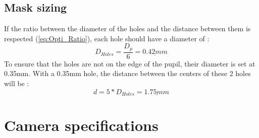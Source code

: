 \subsection{Mask sizing}
If the ratio between the diameter of the holes and the distance between them is respected (\ref{eq:Opti_Ratio}), each hole should have a diameter of :
\begin{equation}\label{eq:Opti_ratio}
    D_{Holes} = \frac{D_p}{6} = \underline{0.42mm}
\end{equation}
To ensure that the holes are not on the edge of the pupil, their diameter is set at 0.35mm. With a 0.35mm hole, the distance
between the centers of these 2 holes will be :
\begin{equation}
    d = 5*D_{Holes} = \underline{1.75mm}
\end{equation}
\section{Camera specifications}\label{sec:Opti_Cam}
